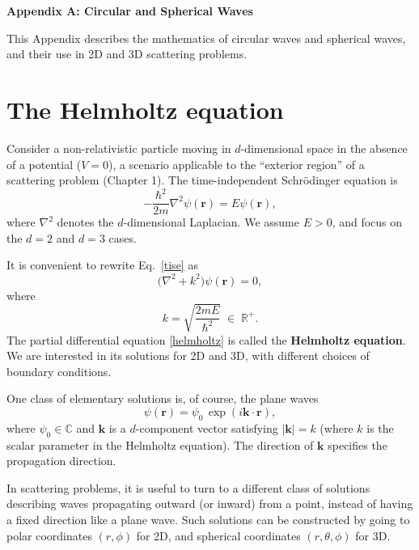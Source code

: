 \documentclass[pra,12pt]{revtex4}
\begin{document}
\begin{center}
{\large \textbf{Appendix A: Circular and Spherical Waves}}
\end{center}

This Appendix describes the mathematics of circular waves and
spherical waves, and their use in 2D and 3D scattering problems.

\section{The Helmholtz equation}

Consider a non-relativistic particle moving in $d$-dimensional space
in the absence of a potential ($V = 0$), a scenario applicable to the
``exterior region'' of a scattering problem (Chapter 1).  The
time-independent Schr\"odinger equation is
\begin{equation}
  -\frac{\hbar^2}{2m}\nabla^2 \psi(\mathbf{r}) = E \psi(\mathbf{r}),
  \label{tise}
\end{equation}
where $\nabla^2$ denotes the $d$-dimensional Laplacian.  We assume $E
> 0$, and focus on the $d = 2$ and $d = 3$ cases.

It is convenient to rewrite Eq.~\eqref{tise} as
\begin{equation}
  \Big(\nabla^2 + k^2\Big) \psi(\mathbf{r}) = 0,
  \label{helmholtz}
\end{equation}
where
\begin{equation}
  k = \sqrt{\frac{2mE}{\hbar^2}} \;\in\; \mathbb{R}^+.
  \label{kparm}
\end{equation}
The partial differential equation \eqref{helmholtz} is called the
\textbf{Helmholtz equation}.  We are interested in its solutions for
2D and 3D, with different choices of boundary conditions.

One class of elementary solutions is, of course, the plane waves
\begin{equation}
  \psi(\mathbf{r}) = \psi_0 \, \exp\left(i\mathbf{k}\cdot\mathbf{r}\right),
  \label{planewaves}
\end{equation}
where $\psi_0 \in \mathbb{C}$ and $\mathbf{k}$ is a $d$-component
vector satisfying $|\mathbf{k}| = k$ (where $k$ is the scalar
parameter in the Helmholtz equation).  The direction of $\mathbf{k}$
specifies the propagation direction.

In scattering problems, it is useful to turn to a different class of
solutions describing waves propagating outward (or inward) from a
point, instead of having a fixed direction like a plane wave.  Such
solutions can be constructed by going to polar coordinates $(r, \phi)$
for 2D, and spherical coordinates $(r,\theta,\phi)$ for 3D.
\end{document}
